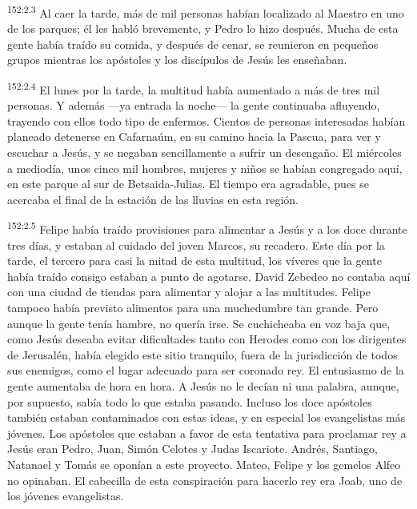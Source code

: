 \par
\textsuperscript{152:2.3} Al caer la tarde, más de mil personas habían localizado al Maestro en uno de los parques; él les habló brevemente, y Pedro lo hizo después. Mucha de esta gente había traído su comida, y después de cenar, se reunieron en pequeños grupos mientras los apóstoles y los discípulos de Jesús les enseñaban.

\par
\textsuperscript{152:2.4} El lunes por la tarde, la multitud había aumentado a más de tres mil personas. Y además ---ya entrada la noche--- la gente continuaba afluyendo, trayendo con ellos todo tipo de enfermos. Cientos de personas interesadas habían planeado detenerse en Cafarnaúm, en su camino hacia la Pascua, para ver y escuchar a Jesús, y se negaban sencillamente a sufrir un desengaño. El miércoles a mediodía, unos cinco mil hombres, mujeres y niños se habían congregado aquí, en este parque al sur de Betsaida-Julias. El tiempo era agradable, pues se acercaba el final de la estación de las lluvias en esta región.

\par
\textsuperscript{152:2.5} Felipe había traído provisiones para alimentar a Jesús y a los doce durante tres días, y estaban al cuidado del joven Marcos, su recadero. Este día por la tarde, el tercero para casi la mitad de esta multitud, los víveres que la gente había traído consigo estaban a punto de agotarse. David Zebedeo no contaba aquí con una ciudad de tiendas para alimentar y alojar a las multitudes. Felipe tampoco había previsto alimentos para una muchedumbre tan grande. Pero aunque la gente tenía hambre, no quería irse. Se cuchicheaba en voz baja que, como Jesús deseaba evitar dificultades tanto con Herodes como con los dirigentes de Jerusalén, había elegido este sitio tranquilo, fuera de la jurisdicción de todos sus enemigos, como el lugar adecuado para ser coronado rey. El entusiasmo de la gente aumentaba de hora en hora. A Jesús no le decían ni una palabra, aunque, por supuesto, sabía todo lo que estaba pasando. Incluso los doce apóstoles también estaban contaminados con estas ideas, y en especial los evangelistas más jóvenes. Los apóstoles que estaban a favor de esta tentativa para proclamar rey a Jesús eran Pedro, Juan, Simón Celotes y Judas Iscariote. Andrés, Santiago, Natanael y Tomás se oponían a este proyecto. Mateo, Felipe y los gemelos Alfeo no opinaban. El cabecilla de esta conspiración para hacerlo rey era Joab, uno de los jóvenes evangelistas.

